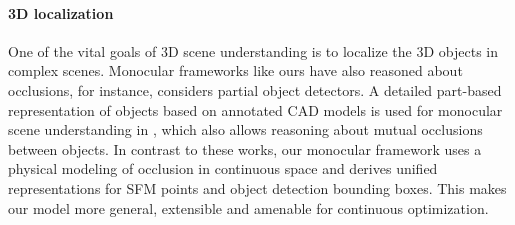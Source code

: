 

\vspace{-0.3cm}
\paragraph{3D localization}
One of the vital goals of 3D scene understanding is to localize the 3D objects in complex scenes. 
Monocular frameworks like ours have also reasoned about occlusions, for instance, \cite{Wojek_etal_2013} considers partial object detectors. A detailed part-based representation of objects based on annotated CAD models is used for monocular scene understanding in \cite{Zia_etal_2013,Zia_etal_2014}, which also allows reasoning about mutual occlusions between objects. In contrast to these works, our monocular framework uses a physical modeling of occlusion in continuous space and derives unified representations for SFM points and object detection bounding boxes. This makes our model more general, extensible and amenable for continuous optimization.


